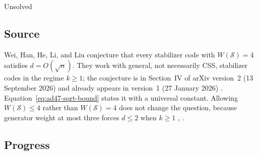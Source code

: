 Unsolved

\subsection*{Source}

Wei, Han, He, Li, and Liu conjecture that every stabilizer code with $W(\mathcal S)=4$ satisfies $d=O(\sqrt n)$. They work with general, not necessarily CSS, stabilizer codes in the regime $k\geq1$; the conjecture is in Section~IV of arXiv version~2 (13 September 2026) and already appears in version~1 (27 January 2026) . Equation~\eqref{eq:ad47-sqrt-bound} states it with a universal constant. Allowing $W(\mathcal S)\leq4$ rather than $W(\mathcal S)=4$ does not change the question, because generator weight at most three forces $d\leq2$ when $k\geq1$ , .

\subsection*{Progress}

